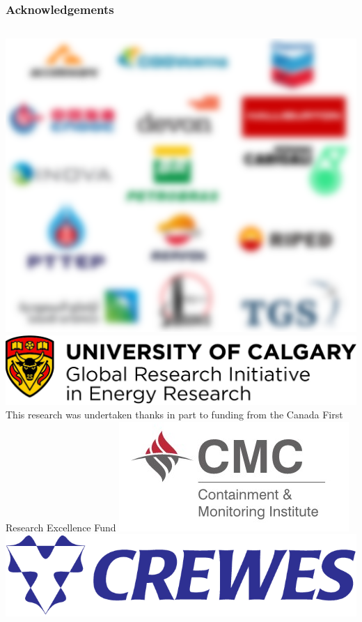 \documentclass[aspectratio=169]{beamer}
\begin{document}
\begin{frame}
 \frametitle{Acknowledgements}
 \begin{columns}
   \centering
   \includegraphics[scale=0.13]{images/sponsors.png}
   \centering
   \includegraphics[scale=0.15]{images/UCgrilockup.jpg}\\
   This research was undertaken thanks in part to funding from the Canada First Research Excellence Fund​
   \includegraphics[scale=1]{images/CaMIlogo.jpg}
   \includegraphics[scale=1.5]{images/CREWESlogoBlue.png}
 \end{columns}
\end{frame}
\end{document}
